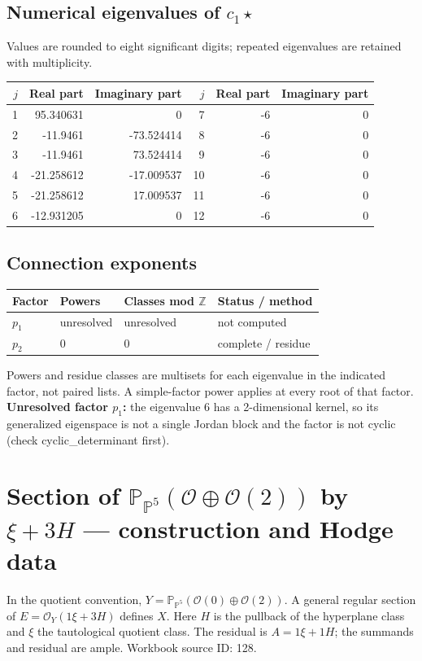 \documentclass[10pt,a4paper]{article}
\begin{document}
\subsection*{Numerical eigenvalues of $c_1\star$}
Values are rounded to eight significant digits; repeated eigenvalues are retained with multiplicity.
\begin{center}\small\begin{tabular}{rrr@{\qquad}rrr}\toprule $j$ & Real part & Imaginary part & $j$ & Real part & Imaginary part\\\midrule
1 & 95.340631 & 0 & 7 & -6 & 0\\
2 & -11.9461 & -73.524414 & 8 & -6 & 0\\
3 & -11.9461 & 73.524414 & 9 & -6 & 0\\
4 & -21.258612 & -17.009537 & 10 & -6 & 0\\
5 & -21.258612 & 17.009537 & 11 & -6 & 0\\
6 & -12.931205 & 0 & 12 & -6 & 0\\
\bottomrule\end{tabular}\end{center}
\subsection*{Connection exponents}
\begin{center}\begin{tabular}{llll}\toprule Factor & Powers & Classes mod $\mathbb Z$ & Status / method\\\midrule
$p_{1}$ & unresolved & unresolved & not computed\\
$p_{2}$ & $0$ & $0$ & complete / residue\\
\bottomrule\end{tabular}\end{center}
Powers and residue classes are multisets for each eigenvalue in the indicated factor, not paired lists. A simple-factor power applies at every root of that factor.
\textbf{Unresolved factor $p_{1}$:} the eigenvalue 6 has a 2-dimensional kernel, so its generalized eigenspace is not a single Jordan block and the factor is not cyclic (check cyclic\_determinant first).
\clearpage\section*{Section of $\mathbb P_{\mathbb P^{5}}(\mathcal O\oplus \mathcal O(2))$ by $\xi +3H$ --- construction and Hodge data}\label{entry:PB5-128}
In the quotient convention, $Y=\mathbb P_{\mathbb P^{5}}(\mathcal O(0)\oplus\mathcal O(2))$.
A general regular section of $E=\mathcal O_Y(1\xi+3H)$ defines $X$.
Here $H$ is the pullback of the hyperplane class and $\xi$ the tautological quotient class. The residual is $A=1\xi+1H$; the summands and residual are ample.
Workbook source ID: 128.
\end{document}
